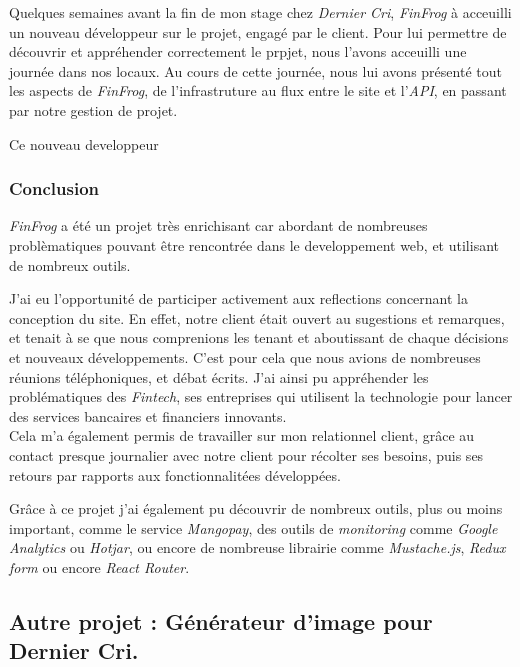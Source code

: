 Quelques semaines avant la fin de mon stage chez \emph{Dernier Cri},
\emph{FinFrog} à acceuilli un nouveau développeur sur le projet, engagé
par le client. Pour lui permettre de découvrir et appréhender
correctement le prpjet, nous l'avons acceuilli une journée dans nos
locaux. Au cours de cette journée, nous lui avons présenté tout les
aspects de \emph{FinFrog}, de l'infrastruture au flux entre le site et
l'\emph{API}, en passant par notre gestion de projet.

\bigskip

Ce nouveau developpeur

\subsubsection{Conclusion}\label{conclusion-1}

\emph{FinFrog} a été un projet très enrichisant car abordant de
nombreuses problèmatiques pouvant être rencontrée dans le developpement
web, et utilisant de nombreux outils.

\bigskip

J'ai eu l'opportunité de participer activement aux reflections
concernant la conception du site. En effet, notre client était ouvert au
sugestions et remarques, et tenait à se que nous comprenions les tenant
et aboutissant de chaque décisions et nouveaux développements. C'est
pour cela que nous avions de nombreuses réunions téléphoniques, et débat
écrits. J'ai ainsi pu appréhender les problématiques des \emph{Fintech},
ses entreprises qui utilisent la technologie pour lancer des services
bancaires et financiers innovants.\\
Cela m'a également permis de travailler sur mon relationnel client,
grâce au contact presque journalier avec notre client pour récolter ses
besoins, puis ses retours par rapports aux fonctionnalitées développées.

\bigskip

Grâce à ce projet j'ai également pu découvrir de nombreux outils, plus
ou moins important, comme le service \emph{Mangopay}, des outils de
\emph{monitoring} comme \emph{Google Analytics} ou \emph{Hotjar}, ou
encore de nombreuse librairie comme \emph{Mustache.js}, \emph{Redux
form} ou encore \emph{React Router}.

\bigskip

\subsection{Autre projet : Générateur d'image pour Dernier
Cri.}\label{autre-projet-guxe9nuxe9rateur-dimage-pour-dernier-cri.}

